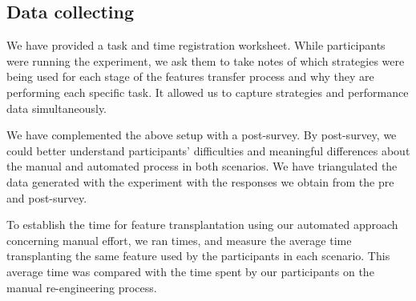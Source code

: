 



\subsection{Data collecting}

We have provided a task and time registration worksheet. While participants were running the experiment, we ask them to take notes of which strategies were being used for each stage of the features transfer process and why they are performing each specific task. It allowed us to capture strategies and performance data simultaneously. 

We have complemented the above setup with a post-survey. By post-survey, we could better understand participants' difficulties and meaningful differences about the manual and automated process in both scenarios. We have triangulated the data generated with the experiment with the responses we obtain from the pre and post-survey.

To establish the time for feature transplantation using our automated approach concerning manual effort, we ran  times, and measure the average time transplanting the same feature used by the participants in each scenario. This average time was compared with the time spent by our participants on the manual re-engineering process. 

